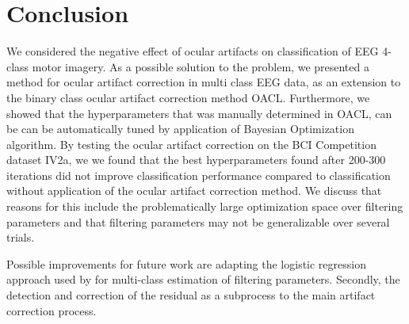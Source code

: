 \section{Conclusion}
We considered the negative effect of ocular artifacts on classification of EEG 4-class motor imagery. As a possible solution to the problem, we presented a method for ocular artifact correction in multi class EEG data, as an extension to the binary class ocular artifact correction method OACL\citep{li2015ocular}. Furthermore, we showed that the hyperparameters that was manually determined in OACL, can be can be automatically tuned by application of Bayesian Optimization algorithm. By testing the ocular artifact correction on the BCI Competition dataset IV2a, we  we found that the best hyperparameters found after 200-300 iterations did not improve classification performance compared to classification without application of the ocular artifact correction method. We discuss that reasons for this include the problematically large optimization space over filtering parameters and that filtering parameters may not be generalizable over several trials.

Possible improvements for future work are adapting the logistic regression approach used by \citep{li2015ocular} for multi-class estimation of filtering parameters. Secondly, the detection and correction of the residual as a subprocess to the main artifact correction process. 
